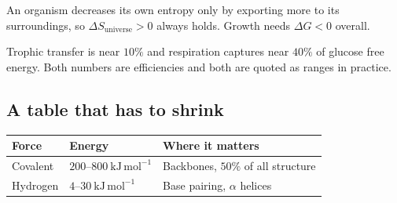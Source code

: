 \begin{thmbox}[title={PRINCIPLE: the second law in a cell}]
An organism decreases its own entropy only by exporting more to its surroundings, so
$\Delta S_{\text{universe}}>0$ always holds. Growth needs $\Delta G<0$ overall.
\end{thmbox}

\begin{obsbox}[title={WORTH NOTICING: the $10\%$ and the $40\%$}]
Trophic transfer is near $10\%$ and respiration captures near $40\%$ of glucose free
energy. Both numbers are efficiencies and both are quoted as ranges in practice.
\end{obsbox}

\subsection{A table that has to shrink}

\begin{tabular}{@{}lp{3.2cm}p{4.4cm}@{}}
\toprule
\textbf{Force} & \textbf{Energy} & \textbf{Where it matters}\\
\midrule
Covalent & $200$--$800\ \mathrm{kJ\,mol^{-1}}$ & Backbones, $50\%$ of all structure\\
Hydrogen & $4$--$30\ \mathrm{kJ\,mol^{-1}}$ & Base pairing, $\alpha$ helices\\
\bottomrule
\end{tabular}
